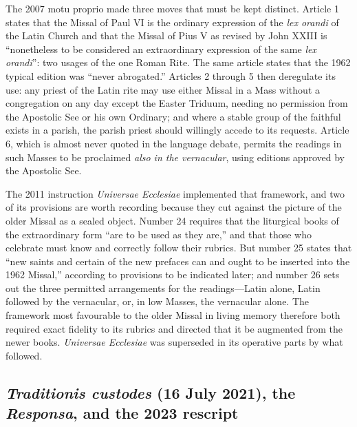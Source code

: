 The 2007 motu proprio made three moves that must be kept distinct. Article 1 states that the Missal of Paul VI is the ordinary expression of the \emph{lex orandi} of the Latin Church and that the Missal of Pius V as revised by John XXIII is ``nonetheless to be considered an extraordinary expression of the same \emph{lex orandi}'': two usages of the one Roman Rite. The same article states that the 1962 typical edition was ``never abrogated.'' Articles 2 through 5 then deregulate its use: any priest of the Latin rite may use either Missal in a Mass without a congregation on any day except the Easter Triduum, needing no permission from the Apostolic See or his own Ordinary; and where a stable group of the faithful exists in a parish, the parish priest should willingly accede to its requests. Article 6, which is almost never quoted in the language debate, permits the readings in such Masses to be proclaimed \emph{also in the vernacular}, using editions approved by the Apostolic See.

The 2011 instruction \emph{Universae Ecclesiae} implemented that framework, and two of its provisions are worth recording because they cut against the picture of the older Missal as a sealed object. Number 24 requires that the liturgical books of the extraordinary form ``are to be used as they are,'' and that those who celebrate must know and correctly follow their rubrics. But number 25 states that ``new saints and certain of the new prefaces can and ought to be inserted into the 1962 Missal,'' according to provisions to be indicated later; and number 26 sets out the three permitted arrangements for the readings---Latin alone, Latin followed by the vernacular, or, in low Masses, the vernacular alone. The framework most favourable to the older Missal in living memory therefore both required exact fidelity to its rubrics and directed that it be augmented from the newer books. \emph{Universae Ecclesiae} was superseded in its operative parts by what followed.

\subsection{\emph{Traditionis custodes} (16 July 2021), the \emph{Responsa}, and the 2023 rescript}

